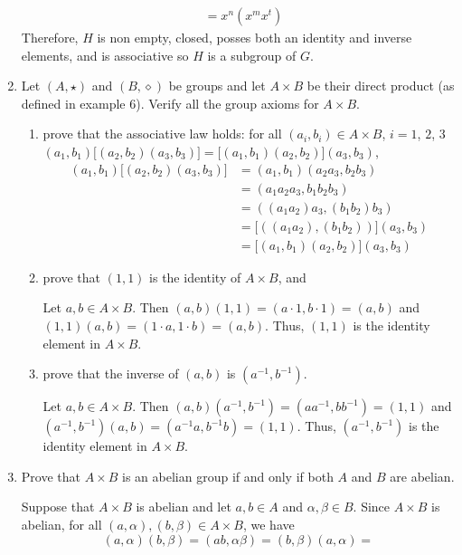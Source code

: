 \begin{enumerate}
\begin{align*}
                & = x^n(x^mx^t)
  \end{align*}
  Therefore, \(H\) is non empty, closed, posses both an identity and inverse
  elements, and is associative so \(H\) is a subgroup of \(G\).
\item
  Let \((A, \star)\) and \((B, \diamond)\) be groups and let \(A\times B\) be
  their direct product (as defined in example \(6\)).
  Verify all the group axioms for \(A\times B\).
  \begin{enumerate}[label = (\alph*)]
  \item
    prove that the associative law holds: for all \((a_i, b_i)\in A\times B\),
    \(i = 1\), \(2\), \(3\)
    \((a_1, b_1)\bigl[(a_2, b_2)(a_3, b_3)\bigr] =
    \bigl[(a_1, b_1)(a_2, b_2)\bigr](a_3, b_3)\),
    \begin{align*}
      (a_1, b_1)\bigl[(a_2, b_2)(a_3, b_3)\bigr]
      & = (a_1, b_1)(a_2a_3, b_2b_3)\\
      & = (a_1a_2a_3, b_1b_2b_3)\\
      & = ((a_1a_2)a_3, (b_1b_2)b_3)\\
      & = \bigl[((a_1a_2), (b_1b_2))\bigr](a_3, b_3)\\
      & = \bigl[(a_1, b_1)(a_2, b_2)\bigr](a_3, b_3)
    \end{align*}
  \item
    prove that \((1, 1)\) is the identity of \(A\times B\), and
    \par\smallskip
    Let \(a,b\in A\times B\).
    Then \((a, b)(1, 1) = (a\cdot 1, b\cdot 1) = (a, b)\) and
    \((1, 1)(a, b) = (1\cdot a, 1\cdot b) = (a , b)\).
    Thus, \((1, 1)\) is the identity element in \(A\times B\).
  \item
    prove that the inverse of \((a, b)\) is \((a^{-1}, b^{-1})\).
    \par\smallskip
    Let \(a,b\in A\times B\).
    Then \((a, b)(a^{-1}, b^{-1}) = (aa^{-1}, bb^{-1}) = (1, 1)\) and
    \((a^{-1}, b^{-1})(a, b) = (a^{-1}a, b^{-1}b) = (1 , 1)\).
    Thus, \((a^{-1}, b^{-1})\) is the identity element in \(A\times B\).
  \end{enumerate}
\item
  Prove that \(A\times B\) is an abelian group if and only if both \(A\) and
  \(B\) are abelian.
  \par\smallskip
  Suppose that \(A\times B\) is abelian and let \(a,b\in A\) and
  \(\alpha,\beta\in B\).
  Since \(A\times B\) is abelian, for all
  \((a, \alpha), (b, \beta)\in A\times B\), we have
  \[
  (a, \alpha)(b, \beta) = (ab, \alpha\beta) = (b, \beta)(a, \alpha) =
\]
\end{enumerate}

